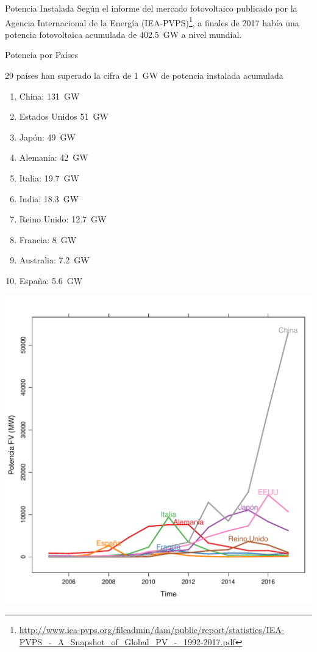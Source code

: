 \documentclass[xcolor={usenames,svgnames,dvipsnames}]{beamer}
\begin{document}
\begin{frame}[label={sec:org461f095}]{Potencia Instalada}
Según el informe del mercado fotovoltaico publicado por la Agencia
Internacional de la Energía (IEA-PVPS)\footnote{\url{http://www.iea-pvps.org/fileadmin/dam/public/report/statistics/IEA-PVPS\_-\_A\_Snapshot\_of\_Global\_PV\_-\_1992-2017.pdf}}, a finales de 2017 había una
potencia fotovoltaica acumulada de \SI{402.5}{\giga\watt} a nivel
mundial.
\end{frame}

\begin{frame}[label={sec:org702a348}]{Potencia por Países}
\begin{block}{29 países han superado la cifra de \SI{1}{\giga\watt} de potencia instalada acumulada}
\begin{enumerate}
\item China: \SI{131}{\giga\watt}
\item Estados Unidos \SI{51}{\giga\watt}
\item Japón: \SI{49}{\giga\watt}
\item Alemania: \SI{42}{\giga\watt}
\item Italia: \SI{19.7}{\giga\watt}
\item India: \SI{18.3}{\giga\watt}
\item Reino Unido: \SI{12.7}{\giga\watt}
\item Francia: \SI{8}{\giga\watt}
\item Australia: \SI{7.2}{\giga\watt}
\item España: \SI{5.6}{\giga\watt}
\end{enumerate}
\end{block}
\end{frame}

\begin{frame}[label={sec:org01d15cf}]{}
\begin{center}
\includegraphics[width=.9\linewidth]{../figs/PVWorld.pdf}
\end{center}
\end{frame}
\end{document}
